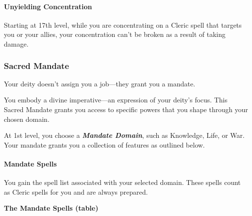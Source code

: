 \paragraph{Unyielding
Concentration}\label{Martyr_Domain_unyielding-concentration}

Starting at 17th level, while you are concentrating on a Cleric spell
that targets you or your allies, your concentration can't be broken as a
result of taking damage.

\subsubsection{Sacred Mandate}\label{Sacred_Mandate_sacred-mandate}

Your deity doesn't assign you a job---\hspace{0pt}they grant you a
mandate.

You embody a divine imperative---\hspace{0pt}an expression of your
deity's focus. This Sacred Mandate grants you access to specific powers
that you shape through your chosen domain.

At 1st level, you choose a \textbf{\emph{Mandate Domain}}, such as
Knowledge, Life, or War. Your mandate grants you a collection of
features as outlined below.

\paragraph{Mandate Spells}\label{Sacred_Mandate_mandate-spells}

You gain the spell list associated with your selected domain. These
spells count as Cleric spells for you and are always prepared.

\textbf{The Mandate Spells (table)}

